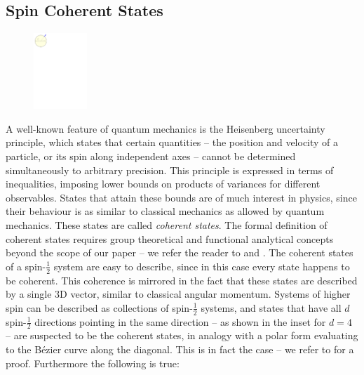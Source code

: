 \documentclass[final,3p,mathptmx]{elsarticle}
\begin{document}
\subsection{Spin Coherent States}\label{sec:spinfacts:coherent}
\begingroup
\setlength{\columnsep}{6pt}
\setlength{\intextsep}{0pt}
\begin{figure}
	\includegraphics[width=0.18\textwidth, keepaspectratio]{figures/majorana_coherent.pdf}
	\label{fig:cylinder}
\end{figure}
A well-known feature of quantum mechanics is the Heisenberg uncertainty principle, which states that certain quantities -- the position and velocity of a particle, or its spin along independent axes --  cannot be determined simultaneously to arbitrary precision. This principle is expressed in terms of inequalities, imposing lower bounds on products of variances for different observables. States that attain these bounds are of much interest in physics, since their behaviour is as similar to classical mechanics as allowed by quantum mechanics. These states are called \emph{coherent states}. The formal definition of coherent states requires group theoretical and functional analytical concepts beyond the scope of our paper -- we refer the reader to \cite{gazeau2009coherent,combescure2012coherent} and \cite{bengtsson2006geometry}. The coherent states of a spin-$\frac{1}{2}$ system are easy to describe, since in this case every state happens to be coherent. This coherence is mirrored in the fact that these states are described by a single 3D vector, similar to classical angular momentum. Systems of higher spin can be described as collections of spin-$\frac{1}{2}$ systems, and states that have all $d$ spin-$\frac{1}{2}$ directions pointing in the same direction -- as shown in the inset for $d = 4$ -- are suspected to be the coherent states, in analogy with a polar form evaluating to the B\'{e}zier curve along the diagonal. This is in fact the case -- we refer to \cite[Ch. 7.2.]{bengtsson2006geometry} for a proof. Furthermore the following is true:
\end{document}
